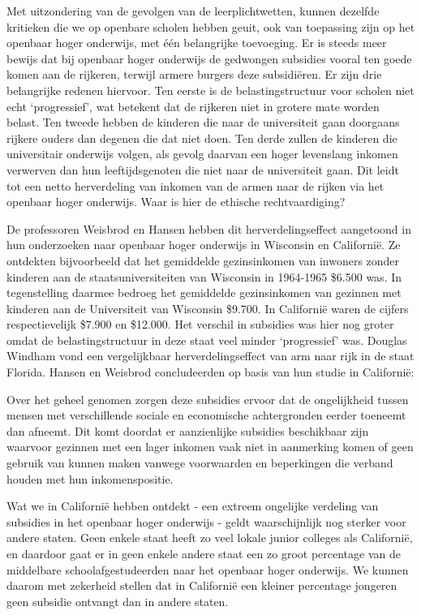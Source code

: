 \documentclass[
  a5paper,
  smalldemyvopaper,10pt,twoside,onecolumn,openright,extrafontsizes,hidelinks]{memoir}
\renewenvironment{quote}%
               {\list{}{\rightmargin=.6cm\leftmargin=.6cm}%
                \itshape \item[]}%
               {\endlist}
\begin{document}
Met uitzondering van de gevolgen van de leerplichtwetten, kunnen
dezelfde kritieken die we op openbare scholen hebben geuit, ook van
toepassing zijn op het openbaar hoger onderwijs, met één belangrijke
toevoeging. Er is steeds meer bewijs dat bij openbaar hoger onderwijs de
gedwongen subsidies vooral ten goede komen aan de rijkeren, terwijl
armere burgers deze subsidiëren. Er zijn drie belangrijke redenen
hiervoor. Ten eerste is de belastingstructuur voor scholen niet echt
`progressief', wat betekent dat de rijkeren niet in grotere mate worden
belast. Ten tweede hebben de kinderen die naar de universiteit gaan
doorgaans rijkere ouders dan degenen die dat niet doen. Ten derde zullen
de kinderen die universitair onderwijs volgen, als gevolg daarvan een
hoger levenslang inkomen verwerven dan hun leeftijdsgenoten die niet
naar de universiteit gaan. Dit leidt tot een netto herverdeling van
inkomen van de armen naar de rijken via het openbaar hoger onderwijs.
Waar is hier de ethische rechtvaardiging?

De professoren Weisbrod en Hansen hebben dit herverdelingseffect
aangetoond in hun onderzoeken naar openbaar hoger onderwijs in Wisconsin
en Californië. Ze ontdekten bijvoorbeeld dat het gemiddelde
gezinsinkomen van inwoners zonder kinderen aan de staatsuniversiteiten
van Wisconsin in 1964-1965 \$6.500 was. In tegenstelling daarmee bedroeg
het gemiddelde gezinsinkomen van gezinnen met kinderen aan de
Universiteit van Wisconsin \$9.700. In Californië waren de cijfers
respectievelijk \$7.900 en \$12.000. Het verschil in subsidies was hier
nog groter omdat de belastingstructuur in deze staat veel minder
`progressief' was. Douglas Windham vond een vergelijkbaar
herverdelingseffect van arm naar rijk in de staat Florida. Hansen en
Weisbrod concludeerden op basis van hun studie in Californië:

\begin{quote}
Over het geheel genomen zorgen deze subsidies ervoor dat de ongelijkheid
tussen mensen met verschillende sociale en economische achtergronden
eerder toeneemt dan afneemt. Dit komt doordat er aanzienlijke subsidies
beschikbaar zijn waarvoor gezinnen met een lager inkomen vaak niet in
aanmerking komen of geen gebruik van kunnen maken vanwege voorwaarden en
beperkingen die verband houden met hun inkomenspositie.

Wat we in Californië hebben ontdekt - een extreem ongelijke verdeling
van subsidies in het openbaar hoger onderwijs - geldt waarschijnlijk nog
sterker voor andere staten. Geen enkele staat heeft zo veel lokale
junior colleges als Californië, en daardoor gaat er in geen enkele
andere staat een zo groot percentage van de middelbare
schoolafgestudeerden naar het openbaar hoger onderwijs. We kunnen daarom
met zekerheid stellen dat in Californië een kleiner percentage jongeren
geen subsidie ontvangt dan in andere staten.
\end{quote}
\end{document}
